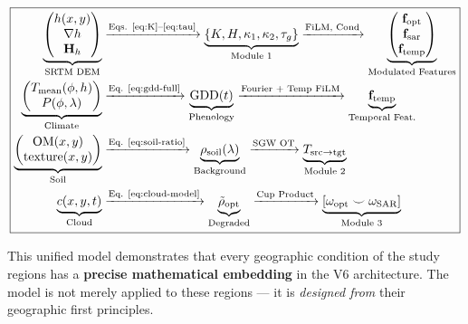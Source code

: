 \begin{equation}\label{eq:unified-geo-math}
\boxed{
\begin{aligned}
    \underbrace{\begin{pmatrix} h(x,y) \\ \nabla h \\ \mathbf{H}_h \end{pmatrix}}_{\text{SRTM DEM}}
    &\xrightarrow{\text{Eqs. \ref{eq:K}--\ref{eq:tau}}}
    \underbrace{\{K, H, \kappa_1, \kappa_2, \tau_g\}}_{\text{Module 1}}
    \xrightarrow{\text{FiLM, Cond}}
    \underbrace{\begin{pmatrix} \mathbf{f}_{\text{opt}} \\ \mathbf{f}_{\text{sar}} \\ \mathbf{f}_{\text{temp}} \end{pmatrix}}_{\text{Modulated Features}} \\
    \underbrace{\begin{pmatrix} T_{\text{mean}}(\phi, h) \\ P(\phi, \lambda) \end{pmatrix}}_{\text{Climate}}
    &\xrightarrow{\text{Eq. \ref{eq:gdd-full}}}
    \underbrace{\text{GDD}(t)}_{\text{Phenology}}
    \xrightarrow{\text{Fourier + Temp FiLM}}
    \underbrace{\mathbf{f}_{\text{temp}}}_{\text{Temporal Feat.}} \\
    \underbrace{\begin{pmatrix} \text{OM}(x,y) \\ \text{texture}(x,y) \end{pmatrix}}_{\text{Soil}}
    &\xrightarrow{\text{Eq. \ref{eq:soil-ratio}}}
    \underbrace{\rho_{\text{soil}}(\lambda)}_{\text{Background}}
    \xrightarrow{\text{SGW OT}}
    \underbrace{T_{\text{src}\to\text{tgt}}}_{\text{Module 2}} \\
    \underbrace{c(x,y,t)}_{\text{Cloud}}
    &\xrightarrow{\text{Eq. \ref{eq:cloud-model}}}
    \underbrace{\tilde{\rho}_{\text{opt}}}_{\text{Degraded}}
    \xrightarrow{\text{Cup Product}}
    \underbrace{[\omega_{\text{opt}} \smile \omega_{\text{SAR}}]}_{\text{Module 3}}
\end{aligned}}
\end{equation}

This unified model demonstrates that every geographic condition of the study
regions has a \textbf{precise mathematical embedding} in the V6 architecture.
The model is not merely applied to these regions — it is \textit{designed from}
their geographic first principles.
